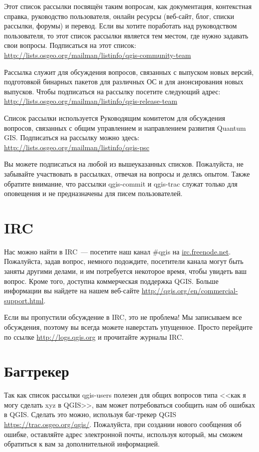 Этот список рассылки посвящён таким вопросам, как документация,
контекстная справка, руководство пользователя, онлайн ресурсы (веб-сайт,
блог, списки рассылки, форумы) и перевод. Если вы хотите поработать над
руководством пользователя, то этот список рассылки является тем местом,
где нужно задавать свои вопросы. Подписаться на этот список: \\
\url{http://lists.osgeo.org/mailman/listinfo/qgis-community-team}

Рассылка служит для обсуждения вопросов, связанных с выпуском новых
версий, подготовкой бинарных пакетов для различных ОС и для
анонсирования новых выпусков. Чтобы подписаться на рассылку посетите
следующий адрес:\\
\url{http://lists.osgeo.org/mailman/listinfo/qgis-release-team}

Список рассылки используется Руководящим комитетом для обсуждения
вопросов, связанных с общим управлением и направлением развития Quantum
GIS. Подписаться на рассылку можно здесь:\\
\url{http://lists.osgeo.org/mailman/listinfo/qgis-psc}

Вы можете подписаться на любой из вышеуказанных списков. Пожалуйста, не
забывайте участвовать в рассылках, отвечая на вопросы и делясь опытом.
Также обратите внимание, что рассылки qgis-commit и qgis-trac служат
только для оповещения и не предназначены для писем пользователей.

\section{IRC}
Нас можно найти в IRC~--- посетите наш канал \#qgis на
\url{irc.freenode.net}. Пожалуйста, задав вопрос, немного подождите,
посетители канала могут быть заняты другими делами, и им потребуется
некоторое время, чтобы увидеть ваш вопрос. Кроме того, доступна
коммерческая поддержка QGIS. Больше информации вы найдете на нашем
веб-сайте \url{http://qgis.org/en/commercial-support.html}.

Если вы пропустили обсуждение в IRC, это не проблема! Мы записываем все
обсуждения, поэтому вы всегда можете наверстать упущенное. Просто
перейдите по ссылке \url{http://logs.qgis.org} и прочитайте журналы IRC.

\section{Багтрекер}
Так как список рассылки qgis-users полезен для общих вопросов типа <<как я
могу сделать xyz в QGIS>>, вам может потребоваться сообщить нам об
ошибках в QGIS. Сделать это можно, используя баг-трекер QGIS
\url{https://trac.osgeo.org/qgis/}. Пожалуйста, при создании нового
сообщения об ошибке, оставляйте адрес электронной почты, используя
который, мы сможем обратиться к вам за дополнительной информацией.

